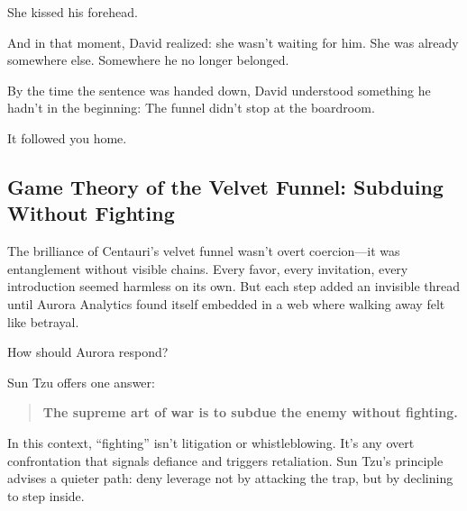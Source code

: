 She kissed his forehead.

And in that moment, David realized:  
she wasn’t waiting for him.  
She was already somewhere else.  
Somewhere he no longer belonged.

By the time the sentence was handed down,  
David understood something he hadn’t in the beginning:  
The funnel didn’t stop at the boardroom.

It followed you home.

\medskip



\subsection{Game Theory of the Velvet Funnel: Subduing Without Fighting}

The brilliance of Centauri’s velvet funnel wasn’t overt coercion—it was entanglement without visible chains. Every favor, every invitation, every introduction seemed harmless on its own. But each step added an invisible thread until Aurora Analytics found itself embedded in a web where walking away felt like betrayal.

How should Aurora respond?

Sun Tzu offers one answer:

\begin{quote}
\textbf{The supreme art of war is to subdue the enemy without fighting.}
\end{quote}

In this context, “fighting” isn’t litigation or whistleblowing. It’s any overt confrontation that signals defiance and triggers retaliation. Sun Tzu’s principle advises a quieter path: deny leverage not by attacking the trap, but by declining to step inside.

\medskip

